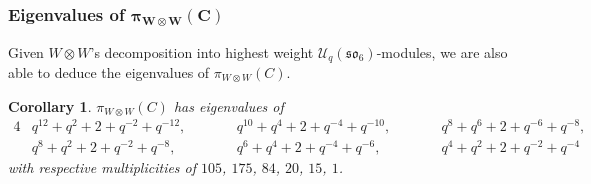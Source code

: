 \documentclass[pdftex]{sigma}
\numberwithin{equation}{section}
\newtheorem{Corollary}[Theorem]{Corollary}
\theoremstyle{definition}
\begin{document}
\subsubsection[Eigenvalues of pi\_\{W otimes W\}(C)]{Eigenvalues of $\boldsymbol{\pi_{W \otimes W}(C)}$}
Given $W \otimes W$'s decomposition into highest weight $\mathcal{U}_q(\mathfrak{so}_6)$-modules, we are also able to deduce the eigenvalues of $\pi_{W \otimes W}(C)$.
\begin{Corollary}
 $\pi_{W \otimes W}(C)$ has eigenvalues of
 \begin{alignat*}{4}
 & q^{12}+q^2+2+q^{-2}+q^{-12}, \qquad&&
 q^{10}+q^4 + 2 + q^{-4}+q^{-10}, \qquad&&
 q^8 +q^6+2+q^{-6}+q^{-8},& \\
& q^8+q^2+2+q^{-2}+q^{-8}, \qquad&&
 q^6 + q^4 +2 + q^{-4}+q^{-6}, \qquad&&
 q^4+q^2+2+q^{-2}+q^{-4}&
 \end{alignat*}
 with respective multiplicities of $105$, $175$, $84$, $20$, $15$, $1$.
\end{Corollary}
\end{document}
